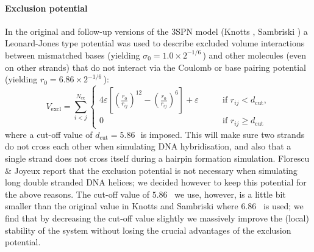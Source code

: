 \paragraph{Exclusion potential} In the original and follow-up versions of the 3SPN model (Knotts \etal \cite{knotts2007coarse}, Sambriski \etal \cite{sambriski2009mesoscale}) a Leonard-Jones type potential was used to describe excluded volume interactions between mismatched bases (yielding $\sigma_0 = 1.0 \times 2^{-1/6}$\,\Angstrom) and other molecules (even on other strands) that do not interact via the Coulomb or base pairing potential (yielding $r_0 = 6.86 \times 2^{-1/6}$\,\Angstrom):
\begin{equation}
V_\text{excl} =  \sum_{i<j}^{N_\text{ex}}\begin{cases} 4\varepsilon \left[ \left(\frac{r_{0}}{r_{ij}} \right)^{12} - \left(\frac{r_{0}}{r_{ij}} \right)^{6} \right] + \varepsilon \qquad &\text{if }r_{ij} < d_\text{cut}, \\ 0 \qquad &\text{if }r_{ij} \geq d_\text{cut} \end{cases} \end{equation}
where a cut-off value of $d_\text{cut} = 5.86$\,\Angstrom\ is imposed. This will make sure two strands do not cross each other when simulating DNA hybridisation, and also that a single strand does not cross itself during a hairpin formation simulation. Florescu \& Joyeux \cite{florescu2011thermal} report that the exclusion potential is not necessary when simulating long double stranded DNA helices; we decided however to keep this potential for the above reasons. The cut-off value of $5.86$ \Angstrom\ we use, however, is a little bit smaller than the original value in Knotts and Sambriski \cite{knotts2007coarse, sambriski2009mesoscale} where $6.86$ \Angstrom\ is used; we find that by decreasing the cut-off value slightly we massively improve the (local) stability of the system without losing the crucial advantages of the exclusion potential.

